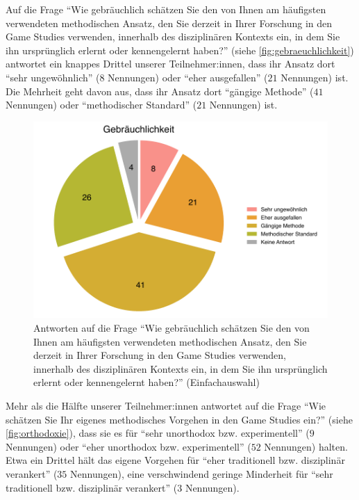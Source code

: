 \documentclass{scrartcl}
\begin{document}
Auf die Frage \enquote{Wie gebräuchlich schätzen Sie den von Ihnen am häufigsten verwendeten methodischen Ansatz, den Sie derzeit in Ihrer Forschung in den Game Studies verwenden, innerhalb des disziplinären Kontexts ein, in dem Sie ihn ursprünglich erlernt oder kennengelernt haben?} (siehe \autoref{fig:gebraeuchlichkeit}) antwortet ein knappes Drittel unserer Teilnehmer:innen, dass ihr Ansatz dort \enquote{sehr ungewöhnlich} ($8$ Nennungen) oder \enquote{eher ausgefallen} ($21$ Nennungen) ist.
Die Mehrheit geht davon aus, dass ihr Ansatz dort \enquote{gängige Methode} ($41$ Nennungen) oder \enquote{methodischer Standard} ($21$ Nennungen) ist.

\begin{figure}[t]
   \includegraphics[width=1\textwidth]{gebraeuchlichkeit.pdf}
   \caption{Antworten auf die Frage \enquote{Wie gebräuchlich schätzen Sie den von Ihnen am häufigsten verwendeten methodischen Ansatz, den Sie derzeit in Ihrer Forschung in den Game Studies verwenden, innerhalb des disziplinären Kontexts ein, in dem Sie ihn ursprünglich erlernt oder kennengelernt haben?} (Einfachauswahl)}
   \label{fig:gebraeuchlichkeit}
\end{figure}

Mehr als die Hälfte unserer Teilnehmer:innen antwortet auf die Frage \enquote{Wie schätzen Sie Ihr eigenes methodisches Vorgehen in den Game Studies ein?} (siehe \autoref{fig:orthodoxie}), dass sie es für \enquote{sehr unorthodox bzw. experimentell} ($9$ Nennungen) oder \enquote{eher unorthodox bzw. experimentell} ($52$ Nennungen) halten.
Etwa ein Drittel hält das eigene Vorgehen für \enquote{eher traditionell bzw. disziplinär verankert} ($35$ Nennungen), eine verschwindend geringe Minderheit für \enquote{sehr traditionell bzw. disziplinär verankert} ($3$ Nennungen).
\end{document}
